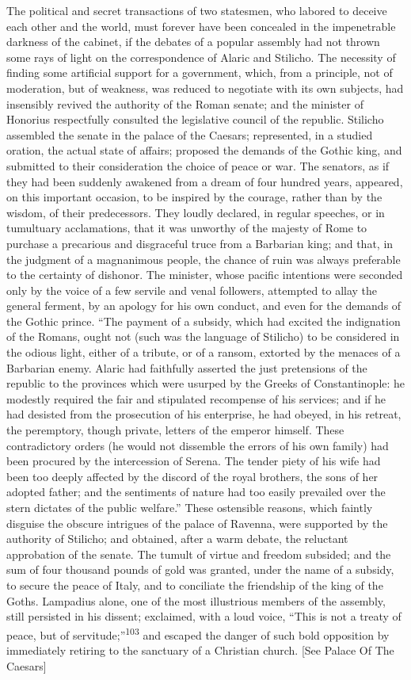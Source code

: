 The political and secret transactions of two statesmen, who
labored to deceive each other and the world, must forever have
been concealed in the impenetrable darkness of the cabinet, if
the debates of a popular assembly had not thrown some rays of
light on the correspondence of Alaric and Stilicho. The necessity
of finding some artificial support for a government, which, from
a principle, not of moderation, but of weakness, was reduced to
negotiate with its own subjects, had insensibly revived the
authority of the Roman senate; and the minister of Honorius
respectfully consulted the legislative council of the republic.
Stilicho assembled the senate in the palace of the Caesars;
represented, in a studied oration, the actual state of affairs;
proposed the demands of the Gothic king, and submitted to their
consideration the choice of peace or war. The senators, as if
they had been suddenly awakened from a dream of four hundred
years, appeared, on this important occasion, to be inspired by
the courage, rather than by the wisdom, of their predecessors.
They loudly declared, in regular speeches, or in tumultuary
acclamations, that it was unworthy of the majesty of Rome to
purchase a precarious and disgraceful truce from a Barbarian
king; and that, in the judgment of a magnanimous people, the
chance of ruin was always preferable to the certainty of
dishonor. The minister, whose pacific intentions were seconded
only by the voice of a few servile and venal followers, attempted
to allay the general ferment, by an apology for his own conduct,
and even for the demands of the Gothic prince. “The payment of a
subsidy, which had excited the indignation of the Romans, ought
not (such was the language of Stilicho) to be considered in the
odious light, either of a tribute, or of a ransom, extorted by
the menaces of a Barbarian enemy. Alaric had faithfully asserted
the just pretensions of the republic to the provinces which were
usurped by the Greeks of Constantinople: he modestly required the
fair and stipulated recompense of his services; and if he had
desisted from the prosecution of his enterprise, he had obeyed,
in his retreat, the peremptory, though private, letters of the
emperor himself. These contradictory orders (he would not
dissemble the errors of his own family) had been procured by the
intercession of Serena. The tender piety of his wife had been too
deeply affected by the discord of the royal brothers, the sons of
her adopted father; and the sentiments of nature had too easily
prevailed over the stern dictates of the public welfare.” These
ostensible reasons, which faintly disguise the obscure intrigues
of the palace of Ravenna, were supported by the authority of
Stilicho; and obtained, after a warm debate, the reluctant
approbation of the senate. The tumult of virtue and freedom
subsided; and the sum of four thousand pounds of gold was
granted, under the name of a subsidy, to secure the peace of
Italy, and to conciliate the friendship of the king of the Goths.
Lampadius alone, one of the most illustrious members of the
assembly, still persisted in his dissent; exclaimed, with a loud
voice, “This is not a treaty of peace, but of servitude;”\textsuperscript{103} and
escaped the danger of such bold opposition by immediately
retiring to the sanctuary of a Christian church. [See Palace Of
The Caesars]

